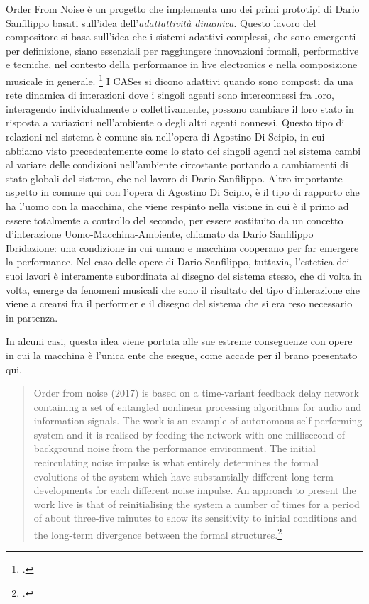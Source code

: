 Order From Noise è un progetto che implementa uno 
dei primi prototipi di Dario Sanfilippo basati sull'idea dell'\textit{adattattività dinamica}. 
Questo lavoro del compositore si basa sull'idea che i sistemi adattivi complessi, 
che sono emergenti per definizione, siano essenziali per raggiungere innovazioni formali, 
performative e tecniche, nel contesto della performance in live electronics e nella composizione musicale in generale. 
\footcite{sanfilippo_time-variant_2018}
I CASes si dicono adattivi quando sono composti da una rete dinamica 
di interazioni dove i singoli agenti sono interconnessi fra loro, interagendo individualmente
o collettivamente, possono cambiare il loro stato in risposta a variazioni nell'ambiente o
degli altri agenti connessi. 
Questo tipo di relazioni nel sistema è comune sia nell'opera di Agostino Di Scipio,
in cui abbiamo visto precedentemente come lo stato dei singoli agenti nel sistema 
cambi al variare delle condizioni nell'ambiente circostante portando a
cambiamenti di stato globali del sistema, che nel lavoro di Dario Sanfilippo.
Altro importante aspetto in comune qui con l'opera di Agostino Di Scipio,
è il tipo di rapporto che ha l'uomo con la macchina, che viene respinto nella visione in cui è il primo
ad essere totalmente a controllo del secondo, per essere sostituito da un concetto 
d'interazione Uomo-Macchina-Ambiente, chiamato da Dario Sanfilippo Ibridazione: 
una condizione in cui umano e macchina cooperano per far emergere la performance. 
Nel caso delle opere di Dario Sanfilippo, tuttavia, l'estetica dei suoi lavori è interamente subordinata
al disegno del sistema stesso, che di volta in volta, emerge da fenomeni musicali che sono il risultato
del tipo d'interazione che viene a crearsi fra il performer e il disegno del sistema che si era reso necessario
in partenza. 

In alcuni casi, questa idea viene portata alle sue estreme conseguenze con opere in cui la macchina è l'unica 
ente che esegue, come accade per il brano presentato qui.

\begin{quote}
    Order from noise (2017) is based on a time-variant feedback delay network containing a 
    set of entangled nonlinear processing algorithms for audio and information signals. 
    The work is an example of autonomous self-performing system and it is realised by
    feeding the network with one millisecond of background noise from the performance
    environment. The initial recirculating noise impulse is what entirely determines the
    formal evolutions of the system which have substantially different long-term developments 
    for each different noise impulse. An approach to present the work live is that
    of reinitialising the system a number of times for a period of about three-five minutes
    to show its sensitivity to initial conditions and the long-term divergence between the
    formal structures.\footcite{sanfilippo_time-variant_2018}
\end{quote}

